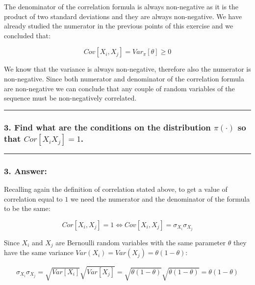 \documentclass[
]{article}
\begin{document}
The denominator of the correlation formula is always non-negative as it
is the product of two standard deviations and they are always
non-negative. We have already studied the numerator in the previous
points of this exercise and we concluded that:

\[
Cov[X_i, X_j] = Var_\pi[\theta] \ge 0
\]

We know that the variance is always non-negative, therefore also the
numerator is non-negative. Since both numerator and denominator of the
correlation formula are non-negative we can conclude that any couple of
random variables of the sequence must be non-negatively correlated.

\begin{center}\rule{0.5\linewidth}{0.5pt}\end{center}

\hypertarget{find-what-are-the-conditions-on-the-distribution-picdot-so-that-corx_i-x_j1.}{%
\subsubsection{\texorpdfstring{3. Find what are the conditions on the
distribution \(\pi(\cdot)\) so that
\(Cor[X_i X_j]=1\).}{3. Find what are the conditions on the distribution \textbackslash pi(\textbackslash cdot) so that Cor{[}X\_i X\_j{]}=1.}}\label{find-what-are-the-conditions-on-the-distribution-picdot-so-that-corx_i-x_j1.}}

\begin{center}\rule{0.5\linewidth}{0.5pt}\end{center}

\hypertarget{answer-12}{%
\subsubsection{3. Answer:}\label{answer-12}}

Recalling again the definition of correlation stated above, to get a
value of correlation equal to \(1\) we need the numerator and the
denominator of the formula to be the same:

\[
Cor[X_i, X_j] = 1 \iff  Cov[X_i, X_j] = \sigma_{X_i}\sigma_{X_j}
\]

Since \(X_i\) and \(X_j\) are Bernoulli random variables with the same
parameter \(\theta\) they have the same variance
\(Var(X_i) = Var(X_j) = \theta(1 - \theta)\):

\[
\sigma_{X_i}\sigma_{X_j} = \sqrt{Var[X_i]}\sqrt{Var[X_j]} = 
\sqrt{\theta(1 - \theta)} \sqrt{\theta(1 - \theta)} =
\theta(1 - \theta)
\]
\end{document}

